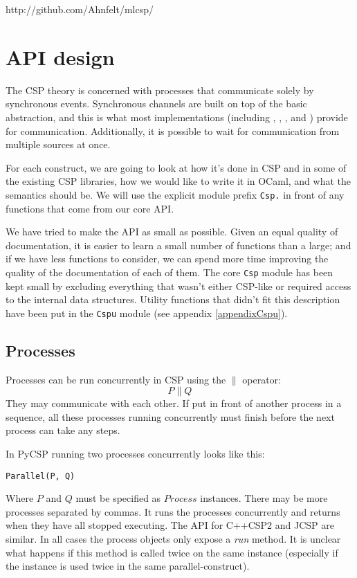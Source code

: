 \documentclass[a4paper,12pt]{article}
\begin{document}
\begin{center}
http://github.com/Ahnfelt/mlcsp/
\end{center}

\section{API design}
\label{apidesign}

The CSP theory is concerned with processes that communicate solely by synchronous 
events. Synchronous channels are built on top of the basic abstraction, and this is
what most implementations (including \cite{occam}, \cite{chp}, \cite{cppcsp2},
\cite{jcsp} and \cite{pycsp}) provide for communication. Additionally, it is
possible to wait for communication from multiple sources at once.

For each construct, we are going to look at how it's done in CSP and in some of
the existing CSP libraries, how we would like to write it in OCaml, and what
the semantics should be. We will use the explicit module prefix \verb|Csp.| in
front of any functions that come from our core API.

We have tried to make the API as small as possible. Given an equal quality of
documentation, it is easier to learn a small number of functions than a large;
and if we have less functions to consider, we can spend more time improving the
quality of the documentation of each of them. The core \verb|Csp| module has
been kept small by excluding everything that wasn't either CSP-like or required
access to the internal data structures. Utility functions that didn't fit this
description have been put in the \verb|Cspu| module (see appendix
\ref{appendixCspu}).

\subsection{Processes}
Processes can be run concurrently in CSP using the $\parallel$ operator:
\[P \parallel Q\]
They may communicate with each other. If put in front of another process in a
sequence, all these processes running concurrently must finish before the next
process can take any steps.

In PyCSP running two processes concurrently looks like this:
\begin{verbatim}
Parallel(P, Q)
\end{verbatim}
Where $P$ and $Q$ must be specified as $Process$ instances. There may be more processes
separated by commas. It runs the processes concurrently and returns when they
have all stopped executing. The API for C++CSP2 and JCSP are similar. In all
cases the process objects only expose a \emph{run} method. It is unclear what
happens if this method is called twice on the same instance (especially if the
instance is used twice in the same parallel-construct).
\end{document}
